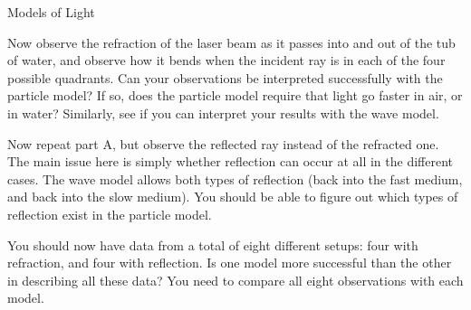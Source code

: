 \begin{lab}{Models of Light}

Now observe the refraction of the laser beam as it passes into and out of the tub of water, and observe how
it bends when the incident ray is in each of the four possible quadrants. Can your observations be
interpreted successfully with the particle model? If so, does the particle model require that light go
faster in air, or in water? Similarly, see if you can interpret your results with the wave model.

Now repeat part A, but observe the reflected ray instead of the refracted one. The main issue here
is simply whether reflection can occur at all in the different cases. The wave model allows both types
of reflection (back into the fast medium, and back into the slow medium). You should be able to figure
out which types of reflection exist in the particle model.

You should now have data from a total of eight different setups: four with refraction, and
four with reflection.
Is one model more successful than the other in describing all these data? You need to compare all
eight observations with each model.

\end{lab}


